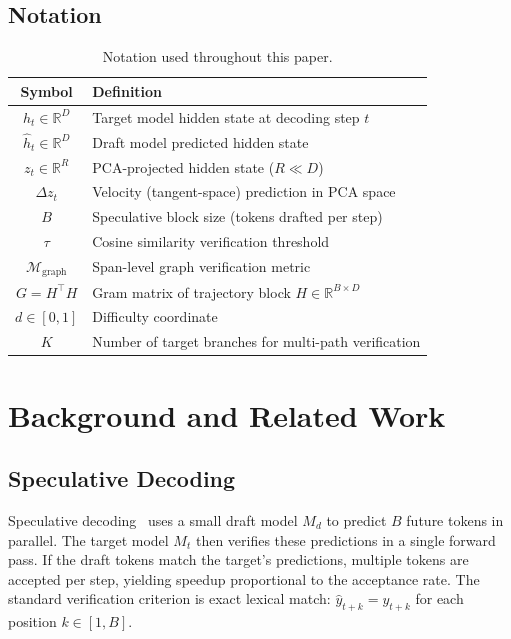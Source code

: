 \documentclass[11pt,a4paper]{article}
\begin{document}
\subsection{Notation}

\begin{table}[H]
\centering
\small
\begin{tabular}{@{}cl@{}}
\toprule
\textbf{Symbol} & \textbf{Definition} \\
\midrule
$h_t \in \mathbb{R}^D$ & Target model hidden state at decoding step $t$ \\
$\hat{h}_t \in \mathbb{R}^D$ & Draft model predicted hidden state \\
$z_t \in \mathbb{R}^R$ & PCA-projected hidden state ($R \ll D$) \\
$\Delta z_t$ & Velocity (tangent-space) prediction in PCA space \\
$B$ & Speculative block size (tokens drafted per step) \\
$\tau$ & Cosine similarity verification threshold \\
$\mathcal{M}_{\mathrm{graph}}$ & Span-level graph verification metric \\
$G = H^\top H$ & Gram matrix of trajectory block $H \in \mathbb{R}^{B \times D}$ \\
$d \in [0,1]$ & Difficulty coordinate \\
$K$ & Number of target branches for multi-path verification \\
\bottomrule
\end{tabular}
\caption{Notation used throughout this paper.}
\label{tab:notation}
\end{table}


\section{Background and Related Work}

\subsection{Speculative Decoding}
Speculative decoding~\cite{leviathan2023speculative,chen2023accelerating} uses a small draft model $M_d$ to predict $B$ future tokens in parallel.
The target model $M_t$ then verifies these predictions in a single forward pass.
If the draft tokens match the target's predictions, multiple tokens are accepted per step, yielding speedup proportional to the acceptance rate.
The standard verification criterion is exact lexical match: $\hat{y}_{t+k} = y_{t+k}$ for each position $k \in [1, B]$.
\end{document}
